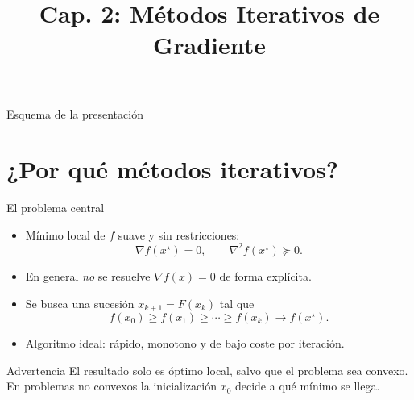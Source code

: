 \documentclass[10pt,aspectratio=169]{beamer}
\title{Cap. 2: Métodos Iterativos de Gradiente}
\begin{document}

\begin{frame}
  \titlepage
\end{frame}

\begin{frame}{Esquema de la presentación}
  \tableofcontents
\end{frame}

\section{¿Por qué métodos iterativos?}

\begin{frame}{El problema central}
  \small
  \begin{itemize}
    \item Mínimo local de $f$ suave y sin restricciones:
      \[
        \nabla f(x^\star)=0, \qquad \nabla^2 f(x^\star)\succeq 0.
      \]
    \item En general \emph{no} se resuelve $\nabla f(x)=0$ de forma explícita.
    \item Se busca una sucesión $x_{k+1}=F(x_k)$ tal que
      \[
        f(x_0)\ge f(x_1)\ge \cdots \ge f(x_k) \to f(x^\star).
      \]
    \item Algoritmo ideal: rápido, monotono y de bajo coste por iteración.
  \end{itemize}
  \begin{alertblock}{Advertencia}
    El resultado solo es óptimo local, salvo que el problema sea convexo.
    En problemas no convexos la inicialización $x_0$ decide a qué mínimo se llega.
  \end{alertblock}
\end{frame}
\end{document}
